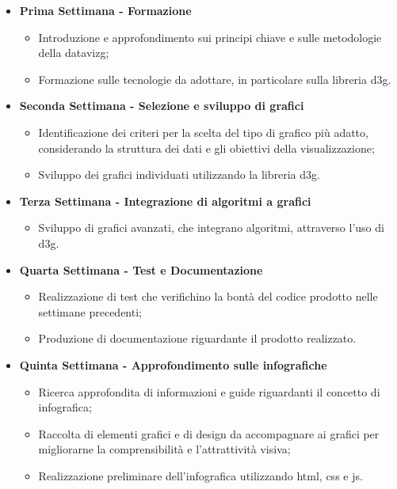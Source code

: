 \begin{itemize}
    \item \textbf{Prima Settimana - Formazione}
    \begin{itemize}
        \item Introduzione e approfondimento sui principi chiave e sulle metodologie della \gls{datavizg};
        \item Formazione sulle tecnologie da adottare, in particolare sulla libreria \gls{d3g}.
    \end{itemize}
    \item \textbf{Seconda Settimana - Selezione e sviluppo di grafici} 
    \begin{itemize}
        \item Identificazione dei criteri per la scelta del tipo di grafico più adatto, considerando la struttura dei dati e gli obiettivi della visualizzazione;
        \item Sviluppo dei grafici individuati utilizzando la libreria \gls{d3g}.
    \end{itemize}
    \item \textbf{Terza Settimana - Integrazione di algoritmi a grafici} 
    \begin{itemize}
        \item Sviluppo di grafici avanzati, che integrano algoritmi, attraverso l'uso di \gls{d3g}.
    \end{itemize}
    \item \textbf{Quarta Settimana - Test e Documentazione} 
    \begin{itemize}
        \item Realizzazione di test che verifichino la bontà del codice prodotto nelle settimane precedenti;
        \item Produzione di documentazione riguardante il prodotto realizzato.
    \end{itemize}
    \item \textbf{Quinta Settimana - Approfondimento sulle infografiche} 
    \begin{itemize}
        \item Ricerca approfondita di informazioni e guide riguardanti il concetto di infografica;
        \item Raccolta di elementi grafici e di design da accompagnare ai grafici per migliorarne la comprensibilità e l'attrattività visiva;
        \item Realizzazione preliminare dell'infografica utilizzando \gls{html}, \gls{css} e \gls{js}.
    \end{itemize}

\end{itemize}
